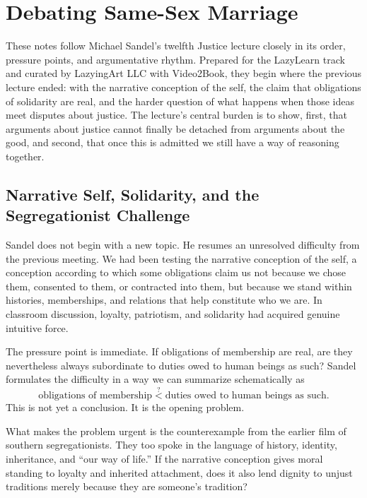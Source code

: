\chapter{Debating Same-Sex Marriage}

These notes follow Michael Sandel's twelfth Justice lecture closely in its order, pressure points, and argumentative rhythm. Prepared for the LazyLearn track and curated by LazyingArt LLC with Video2Book, they begin where the previous lecture ended: with the narrative conception of the self, the claim that obligations of solidarity are real, and the harder question of what happens when those ideas meet disputes about justice. The lecture's central burden is to show, first, that arguments about justice cannot finally be detached from arguments about the good, and second, that once this is admitted we still have a way of reasoning together.

\section{Narrative Self, Solidarity, and the Segregationist Challenge}

Sandel does not begin with a new topic. He resumes an unresolved difficulty from the previous meeting. We had been testing the narrative conception of the self, a conception according to which some obligations claim us not because we chose them, consented to them, or contracted into them, but because we stand within histories, memberships, and relations that help constitute who we are. In classroom discussion, loyalty, patriotism, and solidarity had acquired genuine intuitive force.

The pressure point is immediate. If obligations of membership are real, are they nevertheless always subordinate to duties owed to human beings as such? Sandel formulates the difficulty in a way we can summarize schematically as
\begin{equation}
\text{obligations of membership}
\stackrel{?}{<}
\text{duties owed to human beings as such}.
\end{equation}
This is not yet a conclusion. It is the opening problem.

What makes the problem urgent is the counterexample from the earlier film of southern segregationists. They too spoke in the language of history, identity, inheritance, and ``our way of life.'' If the narrative conception gives moral standing to loyalty and inherited attachment, does it also lend dignity to unjust traditions merely because they are someone's tradition?

